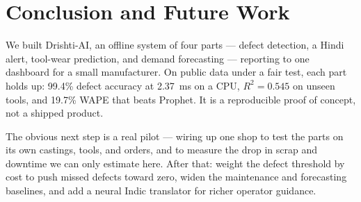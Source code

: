 \documentclass[12pt]{article}
\begin{document}
\section{Conclusion and Future Work}

We built Drishti-AI, an offline system of four parts --- defect detection, a Hindi
alert, tool-wear prediction, and demand forecasting --- reporting to one dashboard
for a small manufacturer. On public data under a fair test, each part holds up:
99.4\% defect accuracy at 2.37~ms on a CPU, $R^2 = 0.545$ on unseen tools, and 19.7\%
WAPE that beats Prophet. It is a reproducible proof of concept, not a shipped
product.

The obvious next step is a real pilot --- wiring up one shop to test the parts on
its own castings, tools, and orders, and to measure the drop in scrap and downtime
we can only estimate here. After that: weight the defect threshold by cost to push
missed defects toward zero, widen the maintenance and forecasting baselines, and add
a neural Indic translator for richer operator guidance.
\end{document}
